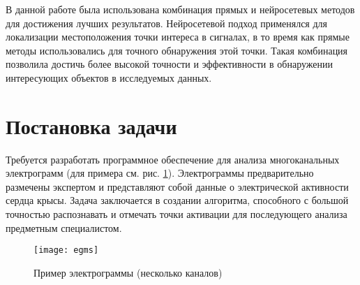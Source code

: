 В данной работе была использована комбинация прямых и нейросетевых методов для
достижения лучших результатов. Нейросетевой подход применялся для локализации
местоположения точки интереса в сигналах, в то время как прямые методы
использовались для точного обнаружения этой точки. Такая комбинация позволила
достичь более высокой точности и эффективности в обнаружении интересующих
объектов в исследуемых данных.

\section{Постановка задачи}

Требуется разработать программное обеспечение для анализа многоканальных
электрограмм (для примера см. рис. \ref{fig:egms}). Электрограммы
предварительно размечены экспертом и представляют собой данные о электрической
активности сердца крысы. Задача заключается в создании алгоритма, способного с
большой точностью распознавать и отмечать точки активации для последующего
анализа предметным специалистом.

\begin{figure}[!htb]
	\centering
	\caption{Пример электрограммы (несколько каналов)}
	\label{fig:egms}
	\texttt{[image: egms]}
\end{figure}
